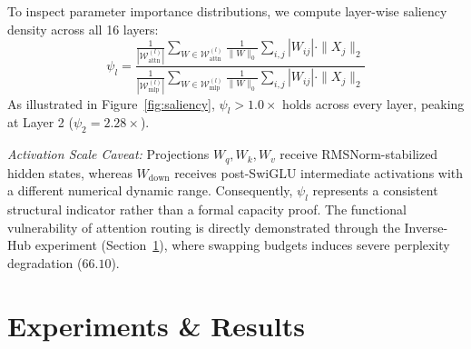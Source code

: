 \documentclass{article}
\begin{document}
To inspect parameter importance distributions, we compute layer-wise saliency density across all 16 layers:
\begin{equation}
\psi_l = \frac{\frac{1}{|\mathcal{W}_{\text{attn}}^{(l)}|} \sum_{W \in \mathcal{W}_{\text{attn}}^{(l)}} \frac{1}{\|W\|_0} \sum_{i,j} |W_{ij}| \cdot \|X_j\|_2}{\frac{1}{|\mathcal{W}_{\text{mlp}}^{(l)}|} \sum_{W \in \mathcal{W}_{\text{mlp}}^{(l)}} \frac{1}{\|W\|_0} \sum_{i,j} |W_{ij}| \cdot \|X_j\|_2}
\end{equation}
As illustrated in Figure~\ref{fig:saliency}, $\psi_l > 1.0\times$ holds across every layer, peaking at Layer 2 ($\psi_2 = 2.28\times$).

\textit{Activation Scale Caveat:} Projections $W_q, W_k, W_v$ receive RMSNorm-stabilized hidden states, whereas $W_{\text{down}}$ receives post-SwiGLU intermediate activations with a different numerical dynamic range. Consequently, $\psi_l$ represents a consistent structural indicator rather than a formal capacity proof. The functional vulnerability of attention routing is directly demonstrated through the Inverse-Hub experiment (Section~\ref{sec:experiments}), where swapping budgets induces severe perplexity degradation ($66.10$).

\section{Experiments \& Results}
\label{sec:experiments}
\end{document}
